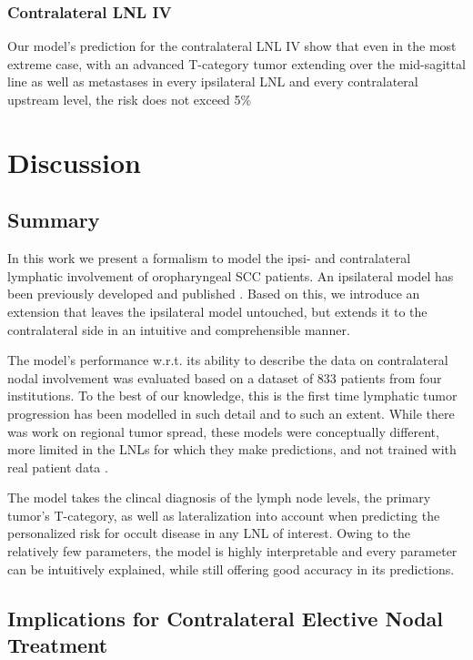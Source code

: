 \documentclass[
  sn-mathphys-num,
]{sn-jnl}
\begin{document}
\subsubsection{Contralateral LNL IV}\label{contralateral-lnl-iv}

Our model's prediction for the contralateral LNL IV show that even in
the most extreme case, with an advanced T-category tumor extending over
the mid-sagittal line as well as metastases in every ipsilateral LNL and
every contralateral upstream level, the risk does not exceed 5\%

\section{Discussion}\label{sec-discussion}

\subsection{Summary}\label{summary}

In this work we present a formalism to model the ipsi- and contralateral
lymphatic involvement of oropharyngeal SCC patients. An ipsilateral
model has been previously developed and published
\citep{ludwig_hidden_2021, ludwig_modelling_2023}. Based on this, we
introduce an extension that leaves the ipsilateral model untouched, but
extends it to the contralateral side in an intuitive and comprehensible
manner.

The model's performance w.r.t. its ability to describe the data on
contralateral nodal involvement was evaluated based on a dataset of 833
patients from four institutions. To the best of our knowledge, this is
the first time lymphatic tumor progression has been modelled in such
detail and to such an extent. While there was work on regional tumor
spread, these models were conceptually different, more limited in the
LNLs for which they make predictions, and not trained with real patient
data \citep{benson_markov_2006, jung_development_2017}.

The model takes the clincal diagnosis of the lymph node levels, the
primary tumor's T-category, as well as lateralization into account when
predicting the personalized risk for occult disease in any LNL of
interest. Owing to the relatively few parameters, the model is highly
interpretable and every parameter can be intuitively explained, while
still offering good accuracy in its predictions.

\subsection{Implications for Contralateral Elective Nodal
Treatment}\label{implications-for-contralateral-elective-nodal-treatment}
\end{document}
